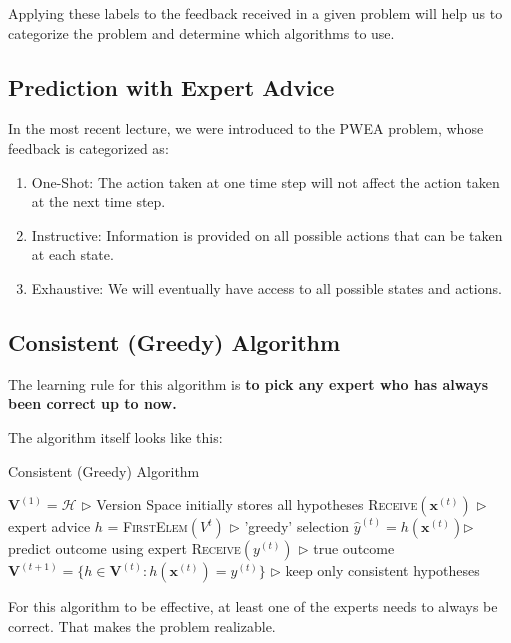 \documentclass[11pt]{article}
\begin{document}
Applying these labels to the feedback received in a given problem will help us to categorize the problem and determine which algorithms to use. 

\subsection{Prediction with Expert Advice}
In the most recent lecture, we were introduced to the PWEA problem, whose feedback is categorized as:
\begin{enumerate}
    \item One-Shot: The action taken at one time step will not affect the action taken at the next time step.
    \item Instructive: Information is provided on all possible actions that can be taken at each state.
    \item Exhaustive: We will eventually have access to all possible states and actions.
\end{enumerate}

\subsection{Consistent (Greedy) Algorithm}

The learning rule for this algorithm is \textbf{to pick any expert who has always been correct up to now.} 

The algorithm itself looks like this:

\begin{algorithm}[H]
\caption{Consistent (Greedy) Algorithm}
\label{algo:CGA}
\begin{algorithmic}[1]
\STATE $\textbf{V}^{(1)} = \mathcal{H}$ \hfill $\triangleright$ Version Space initially stores all hypotheses
\STATE \textsc{Receive}$(\textbf{x}^{(t)})$ \hfill $\triangleright$ expert advice
\STATE $h$ = \textsc{First}\textsc{Elem}$(V^t)$ \hfill $\triangleright$ 'greedy' selection
\STATE $\hat{y}^{(t)} = h(\textbf{x}^{(t)})$\hfill $\triangleright$ predict outcome using expert
\STATE \textsc{Receive}$(y^{(t)})$ \hfill $\triangleright$ true outcome
\STATE $\textbf{V}^{(t+1)} = \{h \in \textbf{V}^{(t)} : h(\textbf{x}^{(t)}) = y^{(t)}\}$ \hfill $\triangleright$ keep only consistent hypotheses
\ENDFOR
\end{algorithmic}
\end{algorithm}

For this algorithm to be effective, at least one of the experts needs to always be correct. That makes the problem realizable.
\end{document}
